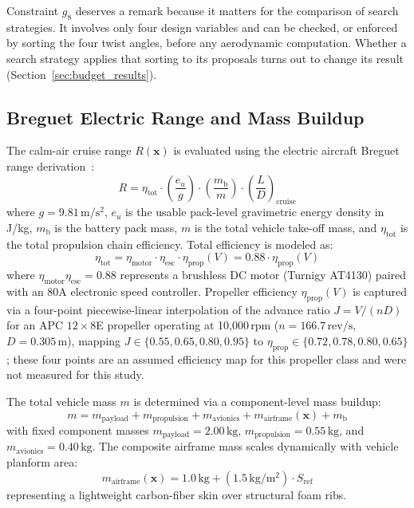 Constraint $g_8$ deserves a remark because it matters for the comparison of search strategies. It involves only four design variables and can be checked, or enforced by sorting the four twist angles, before any aerodynamic computation. Whether a search strategy applies that sorting to its proposals turns out to change its result (Section~\ref{sec:budget_results}).

\subsection{Breguet Electric Range and Mass Buildup}
\label{sec:energy_model}
The calm-air cruise range $R(\mathbf{x})$ is evaluated using the electric aircraft Breguet range derivation~\cite{traub2011range}:
\begin{equation}
R = \eta_{\mathrm{tot}} \cdot \left(\frac{e_u}{g}\right) \cdot \left(\frac{m_{\mathrm{b}}}{m}\right) \cdot \left(\frac{L}{D}\right)_{\mathrm{cruise}}
\label{eq:breguet_range}
\end{equation}
where $g = 9.81\,\mathrm{m/s^2}$, $e_u$ is the usable pack-level gravimetric energy density in J/kg, $m_{\mathrm{b}}$ is the battery pack mass, $m$ is the total vehicle take-off mass, and $\eta_{\mathrm{tot}}$ is the total propulsion chain efficiency. Total efficiency is modeled as:
\begin{equation}
\eta_{\mathrm{tot}} = \eta_{\mathrm{motor}} \cdot \eta_{\mathrm{esc}} \cdot \eta_{\mathrm{prop}}(V) = 0.88 \cdot \eta_{\mathrm{prop}}(V)
\end{equation}
where $\eta_{\mathrm{motor}}\eta_{\mathrm{esc}} = 0.88$ represents a brushless DC motor (Turnigy AT4130) paired with an 80A electronic speed controller. Propeller efficiency $\eta_{\mathrm{prop}}(V)$ is captured via a four-point piecewise-linear interpolation of the advance ratio $J = V/(nD)$ for an APC $12\times8$E propeller operating at 10,000\,rpm ($n = 166.7\,\mathrm{rev/s}$, $D = 0.305\,\mathrm{m}$), mapping $J \in \{0.55, 0.65, 0.80, 0.95\}$ to $\eta_{\mathrm{prop}} \in \{0.72, 0.78, 0.80, 0.65\}$ ; these four points are an assumed efficiency map for this propeller class and were not measured for this study.

The total vehicle mass $m$ is determined via a component-level mass buildup:
\begin{equation}
m = m_{\mathrm{payload}} + m_{\mathrm{propulsion}} + m_{\mathrm{avionics}} + m_{\mathrm{airframe}}(\mathbf{x}) + m_{\mathrm{b}}
\end{equation}
with fixed component masses $m_{\mathrm{payload}} = 2.00\,\mathrm{kg}$, $m_{\mathrm{propulsion}} = 0.55\,\mathrm{kg}$, and $m_{\mathrm{avionics}} = 0.40\,\mathrm{kg}$. The composite airframe mass scales dynamically with vehicle planform area:
\begin{equation}
m_{\mathrm{airframe}}(\mathbf{x}) = 1.0\,\mathrm{kg} + (1.5\,\mathrm{kg/m^2}) \cdot S_{\mathrm{ref}}
\end{equation}
representing a lightweight carbon-fiber skin over structural foam ribs.

